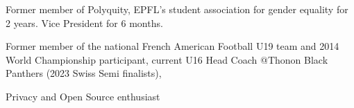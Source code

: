 


\begin{cventries}
	
	
	\cventry
	{} %
	{}
	{}
	{}
	{ %
		\begin{cvitems}
			\item {Former member of Polyquity, EPFL's student association for gender equality for 2 years. Vice President for 6 months.}
			\item {Former member of the national French American Football U19 team and 2014 World Championship participant, current U16 Head Coach @Thonon Black Panthers (2023 Swiss Semi finalists)},
			\item {Privacy and Open Source enthusiast}
		\end{cvitems}
	}
	
	
	
	
\end{cventries}